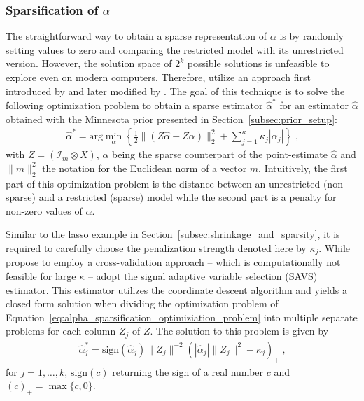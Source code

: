 \subsubsection{Sparsification of \texorpdfstring{$\alpha$}{Alpha}}
\label{subsubsec:sparsification_alpha}
The straightforward way to obtain a sparse representation of $\alpha$ is by randomly setting values to zero and comparing the restricted model with its unrestricted version. However, the solution space of $2^k$ possible solutions is unfeasible to explore even on modern computers. Therefore, \textcite{hauzenberger_combining_2021} utilize an approach first introduced by \textcite{hahn_decoupling_2015} and later modified by \textcite{ray_signal_2018}. The goal of this technique is to solve the following optimization problem to obtain a sparse estimator $\hat{\alpha}^*$ for an estimator $\hat{\alpha}$ obtained with the Minnesota prior presented in Section~\ref{subsec:prior_setup}:
\begin{align}
    \label{eq:alpha_sparsification_optimiziation_problem}
    \hat{\alpha}^* = \text{arg} \min_{\alpha} \left\{ \frac{1}{2} \lVert (Z \hat{\alpha} - Z \alpha) \rVert_2^2 + \sum_{j = 1}^{\kappa} \kappa_j | \alpha_j | \right\} \; \text{,}
\end{align}
with $Z = (\mathcal{I}_m \otimes X)$, $\alpha$ being the sparse counterpart of the point-estimate $\hat{\alpha}$ and $\lVert m \rVert_2^2$ the notation for the Euclidean norm of a vector $m$. Intuitively, the first part of this optimization problem is the distance between an unrestricted (non-sparse) and a restricted (sparse) model while the second part is a penalty for non-zero values of $\alpha$.

Similar to the lasso example in Section~\ref{subsec:shrinkage_and_sparsity}, it is required to carefully choose the penalization strength denoted here by $\kappa_j$. While \textcite{hahn_decoupling_2015} propose to employ a cross-validation approach – which is computationally not feasible for large $\kappa$ – \textcite{ray_signal_2018} adopt the signal adaptive variable selection (SAVS) estimator. This estimator utilizes the coordinate descent algorithm \parencite{friedman_pathwise_2007} and yields a closed form solution when dividing the optimization problem of Equation~\eqref{eq:alpha_sparsification_optimiziation_problem} into multiple separate problems for each column $Z_j$ of $Z$. The solution to this problem is given by
\begin{align}
    \hat{\alpha}_j^* = \text{sign}(\hat{\alpha}_j) \lVert Z_j \rVert^{-2} (| \hat{\alpha}_j | \lVert Z_j \rVert^2 - \kappa_j)_+ \; \text{,}
\end{align}
for $j = 1 , \dots , k$, $\text{sign}(c)$ returning the sign of a real number $c$ and $(c)_+ = \max \{c , 0\}$.

